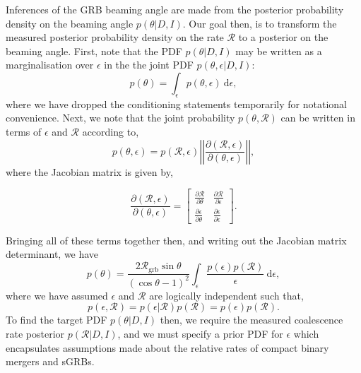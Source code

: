 \documentclass[twocolumn,nofootinbib]{revtex4-1}
\newcommand{\grbrate}{{{\mathcal R}_{\mathrm{grb}}}}
\newcommand{\cbcrate}{{{\mathcal R}}}
\newcommand{\diff}{{\mathrm d}}
\begin{document}
Inferences of the GRB beaming angle are made from the posterior probability
density on the beaming angle $p(\theta|D,I)$.  Our goal then, is to transform
the measured posterior probability density on the rate $\cbcrate$ to a posterior
on the beaming angle.
%
First, note that the PDF $p(\theta|D,I)$ may be written as a marginalisation
over $\epsilon$ in the the joint PDF $p(\theta, \epsilon|D,I)$:
%
\begin{equation}
p(\theta) = \int_{\epsilon} p(\theta,\epsilon)~\diff \epsilon,
\end{equation}
%
where we have dropped the conditioning statements temporarily for notational
convenience.  Next, we note that the joint probability $p(\theta,\cbcrate)$ can
be written in terms of $\epsilon$ and $\cbcrate$ according to,
%
\begin{equation}
p(\theta,\epsilon) = p(\cbcrate,\epsilon)
\left\lvert\left\lvert
\frac{\partial(\cbcrate,\epsilon)}{\partial(\theta,\epsilon)}
\right\rvert\right\rvert,
\end{equation}
%
where the Jacobian matrix is given by,
\begingroup
\renewcommand*{\arraystretch}{1.5}

\begin{equation}
\frac{\partial (\cbcrate,\epsilon)}{\partial(\theta,\epsilon)} =
\begin{bmatrix}
\frac{\partial \cbcrate}{\partial \theta} & \frac{\partial \cbcrate}{\partial \epsilon} \\
\frac{\partial \epsilon}{\partial \theta} & \frac{\partial \epsilon}{\partial \epsilon}
\end{bmatrix}.
\end{equation}

\endgroup
Bringing all of these terms together then, and writing out the Jacobian matrix
determinant, we have
%
\begin{equation}\label{eq:marginaltheta}
p(\theta) = \frac{2\grbrate \sin
\theta}{(\cos\theta-1)^2}\int_{\epsilon} \frac{p(\epsilon)p(\cbcrate)}{\epsilon} ~\diff
\epsilon,
\end{equation}
%
where we have assumed $\epsilon$ and $\cbcrate$ are logically independent such
that,
\begin{equation}
p(\epsilon,\cbcrate) = p(\epsilon|\cbcrate)p(\cbcrate) = p(\epsilon)p(\cbcrate).
\end{equation}
%
%
To find the target PDF $p(\theta|D,I)$ then, we require the measured coalescence
rate posterior $p(\cbcrate|D,I)$, and we must specify a prior PDF for $\epsilon$
which encapsulates assumptions made about the relative rates of compact binary
mergers and sGRBs.
 
\end{document}
